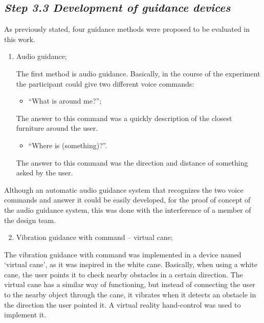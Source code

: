     \subsection*{\textit{Step 3.3 Development of guidance devices}}

        As previously stated, four guidance methods were proposed to be evaluated in this work.
        
        \begin{enumerate} [label = \Alph*)]
            \item Audio guidance;
            
            The first method is audio guidance. Basically, in the course of the experiment the participant could give two different voice commands:

            \begin{itemize} [label = --]
                \item “What is around me?”;
            \end{itemize}

            The answer to this command was a quickly description of the closest furniture around the user.

            \begin{itemize} [label = --]
                \item “Where is (something)?”.
            \end{itemize}

            The answer to this command was the direction and distance of something asked by the user.

        \end{enumerate}

        Although an automatic audio guidance system that recognizes the two voice commands and answer it could be easily developed, for the proof of concept of the audio guidance system, this was done with the interference of a member of the design team.

        \begin{enumerate} [label = \Alph*)]
            \setcounter{enumi}{1}
            \item Vibration guidance with command – virtual cane;
        \end{enumerate}

        The vibration guidance with command was implemented in a device named ‘virtual cane’, as it was inspired in the white cane. Basically, when using a white cane, the user points it to check nearby obstacles in a certain direction. The virtual cane has a similar way of functioning, but instead of connecting the user to the nearby object through the cane, it vibrates when it detects an obstacle in the direction the user pointed it. A virtual reality hand-control was used to implement it. 

